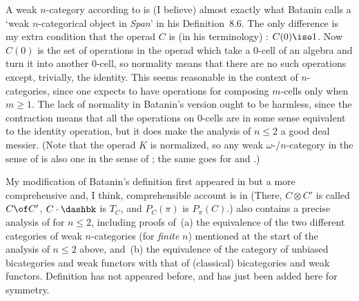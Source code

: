 A weak $n$-category according to  is (I believe) almost exactly what
Batanin calls a `weak $n$-categorical object in \emph{Span}' in his
Definition~8.6.  The only difference is my extra condition that the operad
$C$ is (in his terminology) : $C(0) \iso 1$.  Now $C(0)$ is
the set of operations in the operad which take a $0$-cell of an algebra and
turn it into another $0$-cell, so normality means that there are no such
operations except, trivially, the identity.  This seems reasonable in the
context of $n$-categories, since one expects to have operations for composing
$m$-cells only when $m\geq 1$.  The lack of normality in Batanin's version
ought to be harmless, since the contraction means that all the operations on
$0$-cells are in some sense equivalent to the identity operation, but it does
make the analysis of $n\leq 2$ a good deal messier.  (Note that the operad
$K$ is normalized, so any weak $\omega$-/$n$-category in the sense of 
is also one in the sense of ; the same goes for  and .) 

My modification  of Batanin's definition first appeared in
% 
%
% 
but a more comprehensive and, I think, comprehensible account is in
% 
%
% 
(There, $C\otimes C'$ is called $C\of C'$, $C\cdot \dashbk$ is $T_C$, and
$P_C(\pi)$ is $P_\pi(C)$.)   also contains a precise analysis of
 for $n\leq 2$, including proofs of~(a) the equivalence of the two
different categories of weak $n$-categories (for \emph{finite} $n$)
mentioned at the start of the analysis of $n\leq 2$ above, and~(b) the
equivalence of the category of unbiased bicategories and weak functors with
that of (classical) bicategories and weak functors.  Definition  has not
appeared before, and has just been added here for symmetry. 

